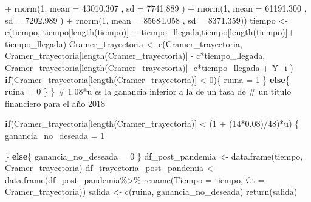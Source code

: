 \documentclass[
  us-letterpaper,
]{scrreprt}
\newenvironment{Shaded}{\begin{snugshade}}{\end{snugshade}}
\newcommand{\AttributeTok}[1]{\textcolor[rgb]{0.40,0.45,0.13}{#1}}
\newcommand{\CommentTok}[1]{\textcolor[rgb]{0.37,0.37,0.37}{#1}}
\newcommand{\ControlFlowTok}[1]{\textcolor[rgb]{0.00,0.23,0.31}{\textbf{#1}}}
\newcommand{\DecValTok}[1]{\textcolor[rgb]{0.68,0.00,0.00}{#1}}
\newcommand{\FloatTok}[1]{\textcolor[rgb]{0.68,0.00,0.00}{#1}}
\newcommand{\FunctionTok}[1]{\textcolor[rgb]{0.28,0.35,0.67}{#1}}
\newcommand{\NormalTok}[1]{\textcolor[rgb]{0.00,0.23,0.31}{#1}}
\newcommand{\OtherTok}[1]{\textcolor[rgb]{0.00,0.23,0.31}{#1}}
\newcommand{\SpecialCharTok}[1]{\textcolor[rgb]{0.37,0.37,0.37}{#1}}
\theoremstyle{plain}
\theoremstyle{plain}
\theoremstyle{definition}
\theoremstyle{remark}
\begin{document}
\begin{Shaded}
\begin{Highlighting}[]
              \SpecialCharTok{+} \FunctionTok{rnorm}\NormalTok{(}\DecValTok{1}\NormalTok{, }\AttributeTok{mean =} \FloatTok{43010.307}\NormalTok{  , }\AttributeTok{sd =} \FloatTok{7741.889}\NormalTok{ ) }
              \SpecialCharTok{+} \FunctionTok{rnorm}\NormalTok{(}\DecValTok{1}\NormalTok{, }\AttributeTok{mean =} \FloatTok{61191.300}\NormalTok{  , }\AttributeTok{sd =} \FloatTok{7202.989}\NormalTok{ ) }
              \SpecialCharTok{+} \FunctionTok{rnorm}\NormalTok{(}\DecValTok{1}\NormalTok{, }\AttributeTok{mean =}  \FloatTok{85684.058}\NormalTok{ , }\AttributeTok{sd =} \FloatTok{8371.359}\NormalTok{)) }
\NormalTok{    tiempo }\OtherTok{\textless{}{-}} \FunctionTok{c}\NormalTok{(tiempo, tiempo[}\FunctionTok{length}\NormalTok{(tiempo)] }\SpecialCharTok{+} 
\NormalTok{                  tiempo\_llegada,tiempo[}\FunctionTok{length}\NormalTok{(tiempo)]}\SpecialCharTok{+} 
\NormalTok{                  tiempo\_llegada) }
\NormalTok{    Cramer\_trayectoria }\OtherTok{\textless{}{-}} \FunctionTok{c}\NormalTok{(Cramer\_trayectoria,}
\NormalTok{    Cramer\_trayectoria[}\FunctionTok{length}\NormalTok{(Cramer\_trayectoria)] }\SpecialCharTok{{-}} 
\NormalTok{      c}\SpecialCharTok{*}\NormalTok{tiempo\_llegada, }
\NormalTok{    Cramer\_trayectoria[}\FunctionTok{length}\NormalTok{(Cramer\_trayectoria)]}\SpecialCharTok{{-}} 
\NormalTok{      c}\SpecialCharTok{*}\NormalTok{tiempo\_llegada }\SpecialCharTok{+}\NormalTok{  Y\_i )}
    \ControlFlowTok{if}\NormalTok{(Cramer\_trayectoria[}\FunctionTok{length}\NormalTok{(Cramer\_trayectoria)] }\SpecialCharTok{\textless{}} \DecValTok{0}\NormalTok{)\{}
\NormalTok{      ruina }\OtherTok{=} \DecValTok{1}
\NormalTok{    \}}
    \ControlFlowTok{else}\NormalTok{\{}
\NormalTok{      ruina }\OtherTok{=} \DecValTok{0}
\NormalTok{    \}}
\NormalTok{  \}}
\CommentTok{\# 1.08*u es la ganancia inferior a la de un tasa de }
\CommentTok{\# un título financiero  para el año 2018}
  
  \ControlFlowTok{if}\NormalTok{(Cramer\_trayectoria[}\FunctionTok{length}\NormalTok{(Cramer\_trayectoria)] }\SpecialCharTok{\textless{}}\NormalTok{ (}\DecValTok{1} \SpecialCharTok{+}\NormalTok{ (}\DecValTok{14}\SpecialCharTok{*}\FloatTok{0.08}\NormalTok{)}\SpecialCharTok{/}\DecValTok{48}\NormalTok{)}\SpecialCharTok{*}\NormalTok{u) \{}
\NormalTok{    ganancia\_no\_deseada }\OtherTok{=} \DecValTok{1}
    
\NormalTok{  \} }
  \ControlFlowTok{else}\NormalTok{\{}
\NormalTok{    ganancia\_no\_deseada }\OtherTok{=} \DecValTok{0}
\NormalTok{  \}}
\NormalTok{  df\_post\_pandemia }\OtherTok{\textless{}{-}} \FunctionTok{data.frame}\NormalTok{(tiempo, Cramer\_trayectoria)}
\NormalTok{  df\_trayectoria\_post\_pandemia }\OtherTok{\textless{}{-}} \FunctionTok{data.frame}\NormalTok{(df\_post\_pandemia}\SpecialCharTok{\%\textgreater{}\%} 
                                  \FunctionTok{rename}\NormalTok{(}\AttributeTok{Tiempo =}\NormalTok{ tiempo,}
                                         \AttributeTok{Ct =}\NormalTok{ Cramer\_trayectoria))}
\NormalTok{  salida }\OtherTok{\textless{}{-}} \FunctionTok{c}\NormalTok{(ruina, ganancia\_no\_deseada)}
  \FunctionTok{return}\NormalTok{(salida)}
  

\end{Highlighting}
\end{Shaded}
\end{document}
